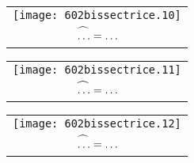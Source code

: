 \par
\begin{tabular}{c}
\texttt{[image: 602bissectrice.10]}\\
$\widehat{\strut\ldots}=\ldots$\\
\end{tabular}
\hfill
\begin{tabular}{c}
\texttt{[image: 602bissectrice.11]}\\
$\widehat{\strut\ldots}=\ldots$\\
\end{tabular}
\hfill
\begin{tabular}{c}
\texttt{[image: 602bissectrice.12]}\\
$\widehat{\strut\ldots}=\ldots$\\
\end{tabular}

